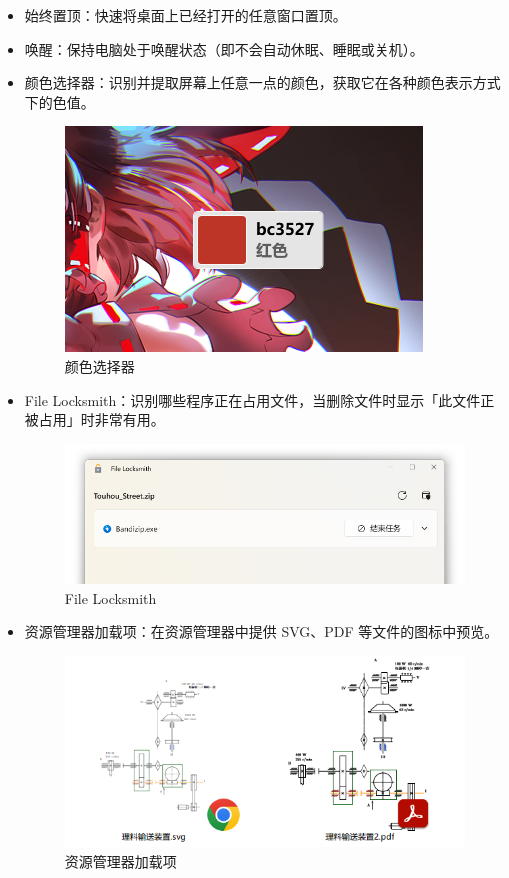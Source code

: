 \begin{itemize}
  \item 始终置顶：快速将桌面上已经打开的任意窗口置顶。
  \item 唤醒：保持电脑处于唤醒状态（即不会自动休眠、睡眠或关机）。
  \item 颜色选择器：识别并提取屏幕上任意一点的颜色，获取它在各种颜色表示方式下的色值。
  \begin{figure}[htb!]
      \centering
      \includegraphics[width=.45\textwidth]{assets/software/Color_Picker.png}
      \caption{颜色选择器}
      \label{fig:Color_Picker}
  \end{figure}
  \item File Locksmith：识别哪些程序正在占用文件，当删除文件时显示「此文件正被占用」时非常有用。
    \begin{figure}[htb!]
      \centering
      \includegraphics[width=.68\textwidth]{assets/software/File_Locksmith.png}
      \caption{File Locksmith}
      \label{fig:File_Locksmith}
    \end{figure}
  \item 资源管理器加载项：在资源管理器中提供 SVG、PDF 等文件的图标中预览。
    \begin{figure}[htb!]
      \centering
      \includegraphics[width=.6\textwidth]{assets/software/Explorer_Addon.png}
      \caption{资源管理器加载项}
      \label{fig:Explorer_Addon}
    \end{figure}

\end{itemize}
